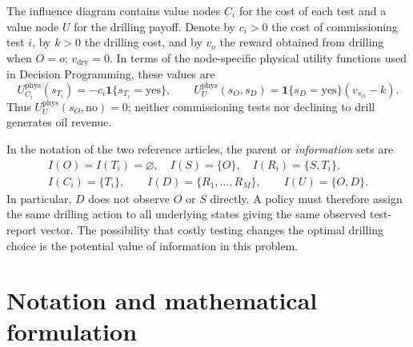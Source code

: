 \documentclass[11pt,a4paper]{article}
\newcommand{\one}{\mathbf{1}}
\begin{document}
The influence diagram contains value nodes $C_i$ for the cost of each
test and a value node $U$ for the drilling payoff.  Denote by
$c_i>0$ the cost of commissioning test $i$, by $k>0$ the drilling
cost, and by $v_o$ the reward obtained from drilling when $O=o$;
$v_{\mathrm{dry}}=0$.  In terms of the node-specific physical utility
functions used in Decision Programming, these values are
\begin{equation}\label{eq:localutil}
 U^{\mathrm{phys}}_{C_i}(s_{T_i})
     =-c_i\one\{s_{T_i}=\mathrm{yes}\},\qquad
 U^{\mathrm{phys}}_U(s_O,s_D)
     =\one\{s_D=\mathrm{yes}\}(v_{s_O}-k).
\end{equation}
Thus $U^{\mathrm{phys}}_U(s_O,\mathrm{no})=0$; neither
commissioning tests nor declining to drill generates oil revenue.

In the notation of the two reference articles, the parent or
\emph{information} sets are
\begin{equation}\label{eq:infosets}
\begin{gathered}
 I(O)=I(T_i)=\varnothing,\quad I(S)=\{O\},\quad
 I(R_i)=\{S,T_i\},\\
 I(C_i)=\{T_i\},\qquad
 I(D)=\{R_1,\ldots,R_M\},\qquad
 I(U)=\{O,D\}.
\end{gathered}
\end{equation}
In particular, $D$ does not observe $O$ or $S$ directly.  A policy
must therefore assign the same drilling action to all underlying
states giving the same observed test-report vector.  The possibility
that costly testing changes the optimal drilling choice is the
potential value of information in this problem.

\section{Notation and mathematical formulation}\label{sec:model}
\end{document}
